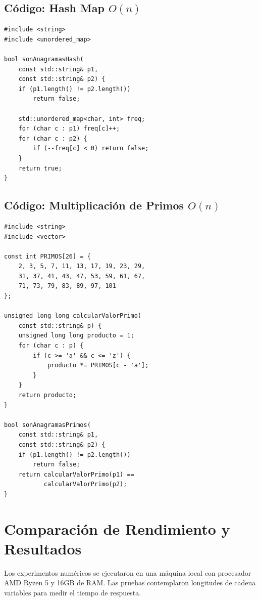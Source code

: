 \documentclass[twocolumn]{article}
\begin{document}
\subsection{Código: Hash Map $O(n)$}
\begin{verbatim}
#include <string>
#include <unordered_map>

bool sonAnagramasHash(
    const std::string& p1, 
    const std::string& p2) {
    if (p1.length() != p2.length()) 
        return false;
        
    std::unordered_map<char, int> freq;
    for (char c : p1) freq[c]++;
    for (char c : p2) {
        if (--freq[c] < 0) return false;
    }
    return true;
}
\end{verbatim}

\subsection{Código: Multiplicación de Primos $O(n)$}
\begin{verbatim}
#include <string>
#include <vector>

const int PRIMOS[26] = {
    2, 3, 5, 7, 11, 13, 17, 19, 23, 29, 
    31, 37, 41, 43, 47, 53, 59, 61, 67, 
    71, 73, 79, 83, 89, 97, 101
};

unsigned long long calcularValorPrimo(
    const std::string& p) {
    unsigned long long producto = 1;
    for (char c : p) {
        if (c >= 'a' && c <= 'z') {
            producto *= PRIMOS[c - 'a'];
        }
    }
    return producto;
}

bool sonAnagramasPrimos(
    const std::string& p1, 
    const std::string& p2) {
    if (p1.length() != p2.length()) 
        return false;
    return calcularValorPrimo(p1) == 
           calcularValorPrimo(p2);
}
\end{verbatim}

\section{Comparación de Rendimiento y Resultados}
Los experimentos numéricos se ejecutaron en una máquina local con procesador AMD Ryzen 5 y 16GB de RAM. Las pruebas contemplaron longitudes de cadena variables para medir el tiempo de respuesta.
\end{document}
